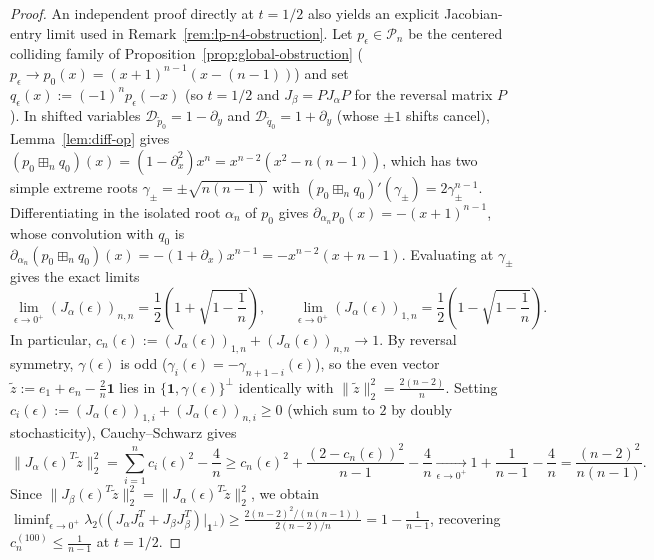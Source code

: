 \documentclass[11pt,a4paper]{article}
\theoremstyle{definition}
\newcommand{\boxplusn}{\boxplus_n}
\newcommand{\one}{\mathbf{1}}
\begin{document}
\begin{proof}
An independent proof directly at $t = 1/2$ also yields an explicit Jacobian-entry limit used in Remark~\ref{rem:lp-n4-obstruction}. Let $p_\epsilon \in \mathcal{P}_n$ be the centered colliding family of Proposition~\ref{prop:global-obstruction} ($p_\epsilon \to p_0(x) = (x+1)^{n-1}(x-(n-1))$) and set $q_\epsilon(x) := (-1)^n p_\epsilon(-x)$ (so $t = 1/2$ and $J_\beta = P J_\alpha P$ for the reversal matrix $P$). In shifted variables $\mathcal{D}_{\tilde{p}_0} = 1 - \partial_y$ and $\mathcal{D}_{\tilde{q}_0} = 1 + \partial_y$ (whose $\pm 1$ shifts cancel), Lemma~\ref{lem:diff-op} gives $(p_0 \boxplusn q_0)(x) = (1 - \partial_x^2) x^n = x^{n-2}(x^2 - n(n-1))$, which has two simple extreme roots $\gamma_\pm = \pm\sqrt{n(n-1)}$ with $(p_0 \boxplusn q_0)'(\gamma_\pm) = 2\gamma_\pm^{n-1}$. Differentiating in the isolated root $\alpha_n$ of $p_0$ gives $\partial_{\alpha_n} p_0(x) = -(x+1)^{n-1}$, whose convolution with $q_0$ is $\partial_{\alpha_n}(p_0 \boxplusn q_0)(x) = -(1 + \partial_x) x^{n-1} = -x^{n-2}(x + n - 1)$. Evaluating at $\gamma_\pm$ gives the exact limits
\begin{equation}
\label{eq:opposite-cluster-jac}
\lim_{\epsilon \to 0^+} (J_\alpha(\epsilon))_{n,n} = \frac{1}{2}\!\left(1 + \sqrt{1 - \frac{1}{n}}\right), \qquad
\lim_{\epsilon \to 0^+} (J_\alpha(\epsilon))_{1,n} = \frac{1}{2}\!\left(1 - \sqrt{1 - \frac{1}{n}}\right).
\end{equation}
In particular, $c_n(\epsilon) := (J_\alpha(\epsilon))_{1,n} + (J_\alpha(\epsilon))_{n,n} \to 1$. By reversal symmetry, $\gamma(\epsilon)$ is odd ($\gamma_i(\epsilon) = -\gamma_{n+1-i}(\epsilon)$), so the even vector $\tilde{z} := e_1 + e_n - \frac{2}{n}\one$ lies in $\{\one, \gamma(\epsilon)\}^\perp$ identically with $\|\tilde{z}\|_2^2 = \frac{2(n-2)}{n}$. Setting $c_i(\epsilon) := (J_\alpha(\epsilon))_{1,i} + (J_\alpha(\epsilon))_{n,i} \ge 0$ (which sum to $2$ by doubly stochasticity), Cauchy--Schwarz gives
\[
\|J_\alpha(\epsilon)^T \tilde{z}\|_2^2
= \sum_{i=1}^n c_i(\epsilon)^2 - \frac{4}{n}
\ge c_n(\epsilon)^2 + \frac{(2 - c_n(\epsilon))^2}{n - 1} - \frac{4}{n}
\xrightarrow[\epsilon \to 0^+]{} 1 + \frac{1}{n - 1} - \frac{4}{n} = \frac{(n-2)^2}{n(n-1)}.
\]
Since $\|J_\beta(\epsilon)^T \tilde{z}\|_2^2 = \|J_\alpha(\epsilon)^T \tilde{z}\|_2^2$, we obtain $\liminf_{\epsilon \to 0^+} \lambda_2\bigl((J_\alpha J_\alpha^T + J_\beta J_\beta^T)|_{\one^\perp}\bigr) \ge \frac{2(n-2)^2/(n(n-1))}{2(n-2)/n} = 1 - \frac{1}{n-1}$, recovering $c_n^{(100)} \le \frac{1}{n-1}$ at $t = 1/2$.
\end{proof}
\end{document}
